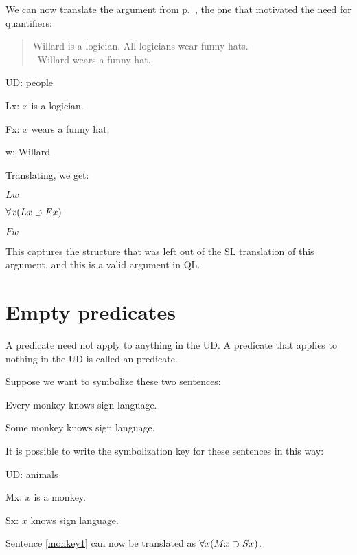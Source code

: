 We can now translate the argument from p.~\pageref{willard1}, the one that motivated the need for quantifiers:
\begin{quote}
Willard is a logician. All logicians wear funny hats.\\
\therefore\ Willard wears a funny hat.
\end{quote}
\begin{ekey}
\item[UD:] people
\item[Lx:] $x$ is a logician.
\item[Fx:] $x$ wears a funny hat.
\item[w:] Willard
\end{ekey}
Translating, we get:
\begin{earg}
\item[] $Lw$
\item[] $\forall x(Lx \supset Fx)$
\item[\therefore] $Fw$
\end{earg}

This captures the structure that was left out of the SL translation of this argument, and this is a valid argument in QL.








\section{Empty predicates}
A predicate need not apply to anything in the UD. A predicate that applies to nothing in the UD is called an  predicate.

Suppose we want to symbolize these two sentences:
\begin{earg}
\item[\ex{monkey1}]Every monkey knows sign language.
\item[\ex{monkey2}]Some monkey knows sign language.
\end{earg}
It is possible to write the symbolization key for these sentences in this way:
\begin{ekey}
\item[UD:] animals
\item[Mx:] $x$ is a monkey.
\item[Sx:] $x$ knows sign language.
\end{ekey}

Sentence \ref{monkey1} can now be translated as $\forall x(Mx \supset Sx)$.


